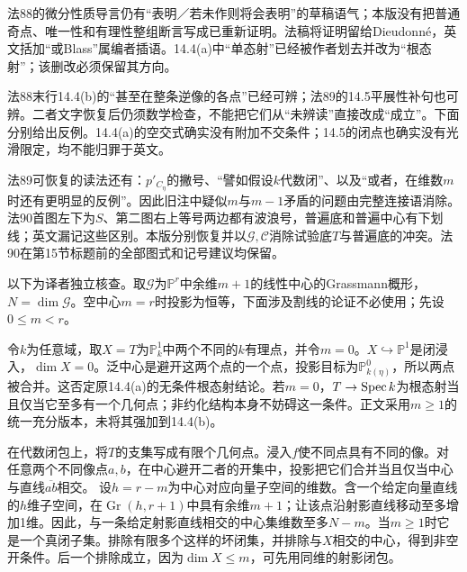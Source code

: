 
法88的微分性质导言仍有“表明／若未作则将会表明”的草稿语气；本版没有把普通奇点、唯一性和有理性整组断言写成已重新证明。法稿将证明留给Dieudonné，英文括加“或Blass”属编者插语。14.4(a)中“单态射”已经被作者划去并改为“根态射”；该删改必须保留其方向。

法88末行14.4(b)的“甚至在整条逆像的各点”已经可辨；法89的14.5平展性补句也可辨。二者文字恢复后仍须数学检查，不能把它们从“未辨读”直接改成“成立”。下面分别给出反例。14.4(a)的空交式确实没有附加不交条件；14.5的闭点也确实没有光滑限定，均不能归罪于英文。

法89可恢复的读法还有：$p'_{C_\eta}$的撇号、“譬如假设$k$代数闭”、以及“或者，在维数$m$时还有更明显的反例”。因此旧注中疑似$m$与$m-1$矛盾的问题由完整连接语消除。法90首图左下为$S$、第二图右上等号两边都有波浪号，普遍底和普遍中心有下划线；英文漏记这些区别。本版分别恢复并以$\mathcal G,\mathcal C$消除试验底$T$与普遍底的冲突。法90在第15节标题前的全部图式和记号建议均保留。

以下为译者独立核查。取$\mathcal G$为$\mathbb P^r$中余维$m+1$的线性中心的Grassmann概形，$N=\dim\mathcal G$。空中心$m=r$时投影为恒等，下面涉及割线的论证不必使用；先设$0\leq m<r$。

令$k$为任意域，取$X=T$为$\mathbb P^1_k$中两个不同的$k$有理点，并令$m=0$。$X\hookrightarrow\mathbb P^1$是闭浸入，$\dim X=0$。泛中心是避开这两个点的一个点，投影目标为$\mathbb P^0_{k(\eta)}$，所以两点被合并。这否定原14.4(a)的无条件根态射结论。若$m=0$，$T\to\operatorname{Spec} k$为根态射当且仅当它至多有一个几何点；非约化结构本身不妨碍这一条件。正文采用$m\geq1$的统一充分版本，未将其强加到14.4(b)。

在代数闭包上，将$T$的支集写成有限个几何点。浸入$f$使不同点具有不同的像。对任意两个不同像点$a,b$，在中心避开二者的开集中，投影把它们合并当且仅当中心与直线$\overline{ab}$相交。
设$h=r-m$为中心对应向量子空间的维数。含一个给定向量直线的$h$维子空间，在$\operatorname{Gr}(h,r+1)$中具有余维$m+1$；让该点沿射影直线移动至多增加1维。因此，与一条给定射影直线相交的中心集维数至多$N-m$。当$m\geq1$时它是一个真闭子集。排除有限多个这样的坏闭集，并排除与$X$相交的中心，得到非空开条件。后一个排除成立，因为$\dim X\leq m$，可先用同维的射影闭包。

